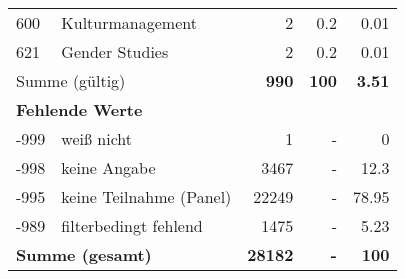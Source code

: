 \begin{longtable}{lXrrr}
        600 & \multicolumn{1}{X}{Kulturmanagement} & %
          \num{2} &
          \num[round-mode=places,round-precision=2]{0.2} &
          \num[round-mode=places,round-precision=2]{0.01} \\

        621 & \multicolumn{1}{X}{Gender Studies} & %
          \num{2} &
          \num[round-mode=places,round-precision=2]{0.2} &
          \num[round-mode=places,round-precision=2]{0.01} \\

     \midrule
     \multicolumn{2}{l}{Summe (gültig)} &
       \textbf{\num{990}} &
     \textbf{\num{100}} &
       \textbf{\num[round-mode=places,round-precision=2]{3.51}} \\
     \multicolumn{5}{l}{\textbf{Fehlende Werte}}\\
       -999 &
       weiß nicht &
         \num{1} &
        - &
         \num[round-mode=places,round-precision=2]{0} \\
       -998 &
       keine Angabe &
         \num{3467} &
        - &
         \num[round-mode=places,round-precision=2]{12.3} \\
       -995 &
       keine Teilnahme (Panel) &
         \num{22249} &
        - &
         \num[round-mode=places,round-precision=2]{78.95} \\
       -989 &
       filterbedingt fehlend &
         \num{1475} &
        - &
         \num[round-mode=places,round-precision=2]{5.23} \\
     \midrule
     \multicolumn{2}{l}{\textbf{Summe (gesamt)}} &
          \textbf{\num{28182}} &
        \textbf{-} &
        \textbf{\num{100}} \\
     \bottomrule
     \end{longtable}
     
